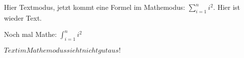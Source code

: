Hier Textmodus, jetzt kommt
eine Formel im Mathemodus: 
\(\sum_{i=1}^{n}i^2\).
Hier ist wieder Text.

Noch mal Mathe: 
$\int_{i=1}^{n}i^2$

\( Text im Mathemodus sieht nicht gut aus! \)